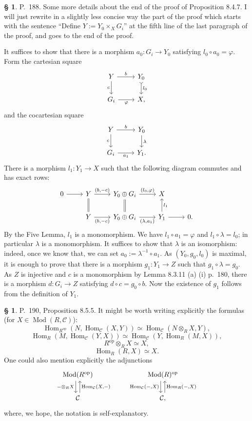 \documentclass[12pt]{article}
\theoremstyle{remark}
\theoremstyle{definition}
\newtheorem{cm}[thm]{\S}
\newcommand{\bc}{\begin{cm}}\newcommand{\ec}{\end{cm}}
\newcommand{\C}{\mathcal C}
\newcommand{\p}{\varphi}
\DeclareMathOperator{\Hom}{Hom}
\DeclareMathOperator{\Mod}{Mod}
\DeclareMathOperator{\op}{op}
\begin{document}

\bc P.~188. Some more details about the end of the proof of Proposition 8.4.7. I will just rewrite in a slightly less concise way the part of the proof which starts with the sentence ``Define $Y:=Y_0\times_XG_i$'' at the fifth line of the last paragraph of the proof, and goes to the end of the proof. 

It suffices to show that there is a morphism $a_0:G_i\to Y_0$ satisfying $l_0\circ a_0=\p$. Form the cartesian square 
$$
\begin{tikzcd}
Y\ar{r}{b}\ar[swap]{d}{c}&Y_0\ar[tail]{d}{l_0}\\
G_i\ar[swap]{r}{\p}&X,
\end{tikzcd}
$$
and the cocartesian square 
$$
\begin{tikzcd}
Y\ar{r}{b}\ar[swap]{d}{c}&Y_0\ar{d}{\lambda}\\
G_i\ar[swap]{r}{a_1}&Y_1.
\end{tikzcd}
$$ 
There is a morphism $l_1:Y_1\to X$ such that the following diagram commutes and has exact rows: 
$$
\begin{tikzcd}
0\ar{r}&Y\ar[equal]{d}\ar{r}{(b,-c)}&Y_0\oplus G_i\ar[equal]{d}\ar{r}{(l_0,\p)}&X\\
&Y\ar{r}[swap]{(b,-c)}&Y_0\oplus G_i\ar{r}[swap]{(\lambda,a_1)}&Y_1\ar{r}\ar{u}[swap]{l_1}&0.
\end{tikzcd}
$$ 
By the Five Lemma, $l_1$ is a monomorphism. We have $l_1\circ a_1=\p$ and $l_1\circ\lambda=l_0$; in particular $\lambda$ is a monomorphism. It suffices to show that $\lambda$ is an isomorphism: indeed, once we know that, we can set $a_0:=\lambda^{-1}\circ a_1$. As $(Y_0,g_0,l_0)$ is maximal, it is enough to prove that there is a morphism $g_1:Y_1\to Z$ such that $g_1\circ\lambda=g_0$. As $Z$ is injective and $c$ is a monomorphism by Lemma 8.3.11 (a) (i) p.~180, there is a morphism $d:G_i\to Z$ satisfying $d\circ c=g_0\circ b$. Now the existence of $g_1$ follows from the definition of $Y_1$.
\ec 


\bc P.~190, Proposition 8.5.5. It might be worth writing explicitly the formulas (for $X\in\Mod(R,\C)$):
$$
\Hom_{R^{\op}}(N,\Hom_\C(X,Y))\simeq
\Hom_\C\left(N\otimes_RX,Y\right),
$$
$$
\Hom_R(M,\Hom_\C(Y,X))\simeq
\Hom_\C\left(Y,\Hom_R(M,X)\right),
$$
$$
R^{\op}\otimes_RX\simeq X,
$$
$$
\Hom_R(R,X)\simeq X.
$$
One could also mention explicitly the adjunctions
$$
\begin{tikzcd}
\Mod(R^{\op})\ar[xshift=-0.7ex]{d}[swap]{-\otimes_RX}&&&
\Mod(R)^{\op}\ar[xshift=-0.7ex]{d}[swap]{\Hom_\C(-,X)}\\
\C\ar[xshift=0.7ex]{u}[swap]{\Hom_\C(X,-)}&&&\C,\ar[xshift=0.7ex]{u}[swap]{\Hom_R(-,X)}
\end{tikzcd}
$$
where, we hope, the notation is self-explanatory.
\ec 
\end{document}
